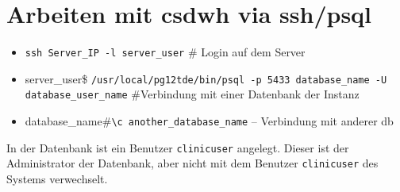    \section{Arbeiten mit \acs{csdwh} via ssh/psql}
   
   \begin{itemize}
   	\item \texttt{ssh Server\_IP -l server\_user} \# Login auf dem Server
   	\item server\_user\$ \texttt{/usr/local/pg12tde/bin/psql -p 5433 database\_name -U database\_user\_name} \#Verbindung mit einer Datenbank der Instanz 
   	\item database\_name\#\texttt{\textbackslash c another\_database\_name} -- Verbindung mit anderer \ac{db}
   \end{itemize}
In der Datenbank ist ein Benutzer \texttt{clinicuser} angelegt. Dieser ist der Administrator der Datenbank, aber nicht mit dem Benutzer \texttt{clinicuser} des Systems verwechselt.
